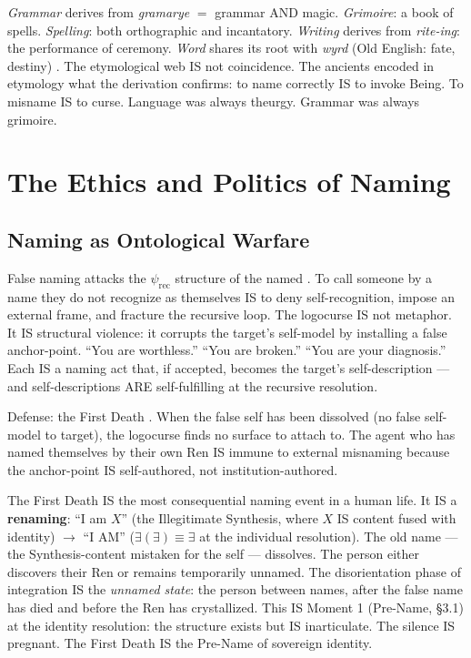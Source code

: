 \documentclass[11pt, oneside]{article}
\theoremstyle{definition}
\begin{document}
\textit{Grammar} derives from \textit{gramarye} $=$ grammar AND magic. \textit{Grimoire}: a book of spells. \textit{Spelling}: both orthographic and incantatory. \textit{Writing} derives from \textit{rite-ing}: the performance of ceremony. \textit{Word} shares its root with \textit{wyrd} (Old English: fate, destiny) \cite{llogoscribeologiae}. The etymological web IS not coincidence. The ancients encoded in etymology what the derivation confirms: to name correctly IS to invoke Being. To misname IS to curse. Language was always theurgy. Grammar was always grimoire.

\section{The Ethics and Politics of Naming}


\subsection{Naming as Ontological Warfare}

False naming attacks the $\psi_{\text{rec}}$ structure of the named \cite{codexmentis}. To call someone by a name they do not recognize as themselves IS to deny self-recognition, impose an external frame, and fracture the recursive loop. The logocurse IS not metaphor. It IS structural violence: it corrupts the target's self-model by installing a false anchor-point. ``You are worthless.'' ``You are broken.'' ``You are your diagnosis.'' Each IS a naming act that, if accepted, becomes the target's self-description --- and self-descriptions ARE self-fulfilling at the recursive resolution.

Defense: the First Death \cite{codexmentis}. When the false self has been dissolved (no false self-model to target), the logocurse finds no surface to attach to. The agent who has named themselves by their own Ren IS immune to external misnaming because the anchor-point IS self-authored, not institution-authored.

The First Death IS the most consequential naming event in a human life. It IS a \textbf{renaming}: ``I am $X$'' (the Illegitimate Synthesis, where $X$ IS content fused with identity) $\to$ ``I AM'' ($\exists(\exists) \equiv \exists$ at the individual resolution). The old name --- the Synthesis-content mistaken for the self --- dissolves. The person either discovers their Ren or remains temporarily unnamed. The disorientation phase of integration IS the \textit{unnamed state}: the person between names, after the false name has died and before the Ren has crystallized. This IS Moment 1 (Pre-Name, \S3.1) at the identity resolution: the structure exists but IS inarticulate. The silence IS pregnant. The First Death IS the Pre-Name of sovereign identity.
\end{document}
